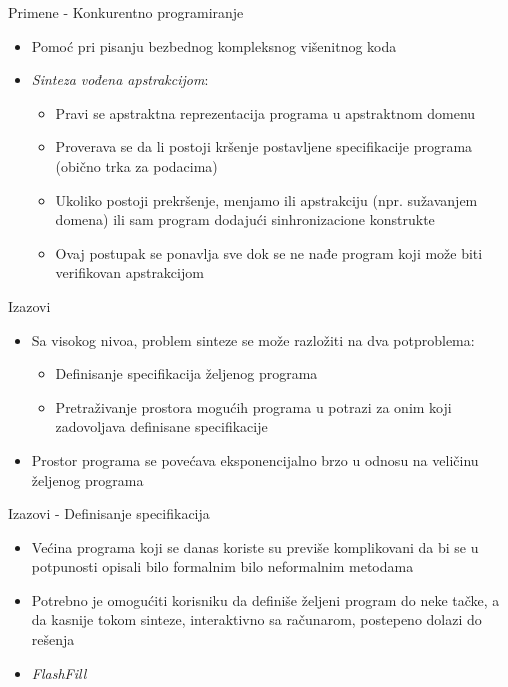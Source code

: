 \documentclass{beamer}
\begin{document}
\begin{frame}{Primene - Konkurentno programiranje}
    \begin{itemize}
        \item Pomoć pri pisanju bezbednog kompleksnog višenitnog koda
        \item \emph{Sinteza vođena apstrakcijom}:
        \begin{itemize}
            \item Pravi se apstraktna reprezentacija programa u apstraktnom domenu
            \item Proverava se da li postoji kršenje postavljene specifikacije programa (obično trka za podacima)
            \item Ukoliko postoji prekršenje, menjamo ili apstrakciju (npr. sužavanjem domena) ili sam program dodajući sinhronizacione konstrukte
            \item Ovaj postupak se ponavlja sve dok se ne nađe program koji može biti verifikovan apstrakcijom
        \end{itemize}
    \end{itemize}
\end{frame}

\begin{frame}{Izazovi}
    \begin{itemize}
        \item Sa visokog nivoa, problem sinteze se može razložiti na dva potproblema:
            \begin{itemize}
                \item Definisanje specifikacija željenog programa
                \item Pretraživanje prostora mogućih programa u potrazi za onim koji zadovoljava definisane specifikacije
            \end{itemize}
        \item Prostor programa se povećava eksponencijalno brzo u odnosu na veličinu željenog programa
    \end{itemize}
\end{frame}


\begin{frame}{Izazovi - Definisanje specifikacija}
    \begin{itemize}
        \item Većina programa koji se danas koriste su previše komplikovani da bi se u potpunosti opisali bilo formalnim bilo neformalnim metodama
        \item Potrebno je omogućiti korisniku da definiše željeni program do neke tačke, a da kasnije tokom sinteze, interaktivno sa računarom, postepeno dolazi do rešenja
        \item \emph{FlashFill}
    \end{itemize}
\end{frame}
\end{document}
